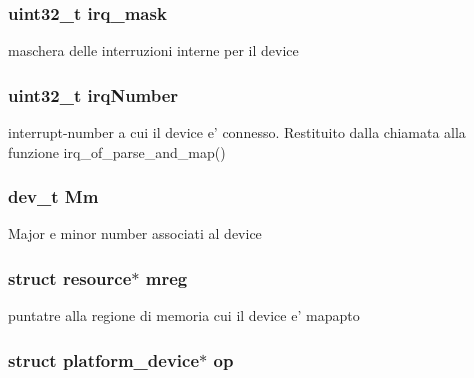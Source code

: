 \hypertarget{structmy_g_p_i_o_k__t_a8ee102d0534084ca58a9cf9b8a3d9cc9}{
\subsubsection[{irq\+\_\+mask}]{\setlength{\rightskip}{0pt plus 5cm}uint32\+\_\+t irq\+\_\+mask}}\label{structmy_g_p_i_o_k__t_a8ee102d0534084ca58a9cf9b8a3d9cc9}
maschera delle interruzioni interne per il device \hypertarget{structmy_g_p_i_o_k__t_a42a1593ebe61611c4e29413903a373a5}{
\subsubsection[{irq\+Number}]{\setlength{\rightskip}{0pt plus 5cm}uint32\+\_\+t irq\+Number}}\label{structmy_g_p_i_o_k__t_a42a1593ebe61611c4e29413903a373a5}
interrupt-\/number a cui il device e' connesso. Restituito dalla chiamata alla funzione irq\+\_\+of\+\_\+parse\+\_\+and\+\_\+map() \hypertarget{structmy_g_p_i_o_k__t_aeb60fb4e41b5f11f70ebe969361884f4}{
\subsubsection[{Mm}]{\setlength{\rightskip}{0pt plus 5cm}dev\+\_\+t Mm}}\label{structmy_g_p_i_o_k__t_aeb60fb4e41b5f11f70ebe969361884f4}
Major e minor number associati al device \hypertarget{structmy_g_p_i_o_k__t_a18c4eb95350c67ccb239a8a39c43c09a}{
\subsubsection[{mreg}]{\setlength{\rightskip}{0pt plus 5cm}struct resource$\ast$ mreg}}\label{structmy_g_p_i_o_k__t_a18c4eb95350c67ccb239a8a39c43c09a}
puntatre alla regione di memoria cui il device e' mapapto \hypertarget{structmy_g_p_i_o_k__t_a3a7801058bef8fbe4a2cec3c9579cd70}{
\subsubsection[{op}]{\setlength{\rightskip}{0pt plus 5cm}struct platform\+\_\+device$\ast$ op}}\label{structmy_g_p_i_o_k__t_a3a7801058bef8fbe4a2cec3c9579cd70}
